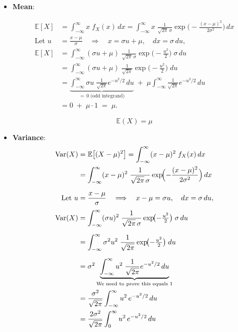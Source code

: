 \documentclass[twoside]{book}
\begin{document}
\begin{itemize}
    \item \textbf{Mean}:
    
    \begin{align*}
    \mathbb{E}[X]
    &= \int_{-\infty}^{\infty} x \; f_X(x)\,dx
    = \int_{-\infty}^{\infty} x \;\frac{1}{\sqrt{2\pi}\,\sigma}
    \exp\!\biggl(-\frac{(x-\mu)^2}{2\sigma^2}\biggr)\,dx \\[6pt]
    \text{Let } u &= \frac{x - \mu}{\sigma}
    \quad\Longrightarrow\quad
    x = \sigma u + \mu,
    \quad dx = \sigma\,du, \\[3pt]
    \mathbb{E}[X] &= \int_{-\infty}^{\infty}
    (\sigma u + \mu)\;
    \frac{1}{\sqrt{2\pi}\,\sigma}
    \exp\!\bigl(-\tfrac{u^2}{2}\bigr)\;\sigma\,du \\[6pt]
    &= \int_{-\infty}^{\infty}
    (\sigma u + \mu)\;
    \frac{1}{\sqrt{2\pi}}
    \exp\!\bigl(-\tfrac{u^2}{2}\bigr)\;du \\[6pt]
    &= \underbrace{\int_{-\infty}^{\infty}
    \sigma u \;\frac{1}{\sqrt{2\pi}}
    e^{-u^2/2}\,du}_{=\,0\;\text{(odd integrand)}} 
    \;+\;
    \mu \int_{-\infty}^{\infty}
    \frac{1}{\sqrt{2\pi}}
    e^{-u^2/2}\,du \\[6pt]
    &= 0 \;+\; \mu \cdot 1 
    \;=\; \mu.
    \end{align*}
    
    \begin{textbox}
        \[
        \mathbb{E}(X) = \mu
        \]
        \end{textbox}
    

    \item \textbf{Variance}:
    \begin{align*}
    \operatorname{Var}(X)
    &= \mathbb{E}\bigl[(X - \mu)^2\bigr]
    = \int_{-\infty}^{\infty} (x - \mu)^2 \; f_X(x)\,dx \\
    &= \int_{-\infty}^{\infty} (x - \mu)^2 \;\frac{1}{\sqrt{2\pi}\,\sigma}
    \exp\!\Bigl(-\frac{(x-\mu)^2}{2\sigma^2}\Bigr)\,dx \\[6pt]
    \text{Let } u &= \frac{x - \mu}{\sigma}
    \quad\Longrightarrow\quad
    x - \mu = \sigma u,
    \quad dx = \sigma\,du, \\[3pt]
    \operatorname{Var}(X)&= \int_{-\infty}^{\infty}
    (\sigma u)^2 \;
    \frac{1}{\sqrt{2\pi}\,\sigma}
    \exp\!\bigl(-\tfrac{u^2}{2}\bigr)\;\sigma\,du \\[6pt]
    &= \int_{-\infty}^{\infty}
    \sigma^2 u^2 \;
    \frac{1}{\sqrt{2\pi}}
    \exp\!\bigl(-\tfrac{u^2}{2}\bigr)\;du \\[6pt]
    &= \sigma^2 \underbrace{\int_{-\infty}^{\infty}
            u^2 \;\frac{1}{\sqrt{2\pi}} e^{-u^2/2}\,du}_{\text{We need to prove this equals 1}}\\
    &= \frac{\sigma^2}{\sqrt{2\pi}} \int_{-\infty}^{\infty} u^2\,e^{-u^2/2}\,du\\
    &= \frac{2\sigma^2}{\sqrt{2\pi}} \int_{0}^{\infty} u^2\,e^{-u^2/2}\,du\
    \end{align*}
    

\end{itemize}
\end{document}

